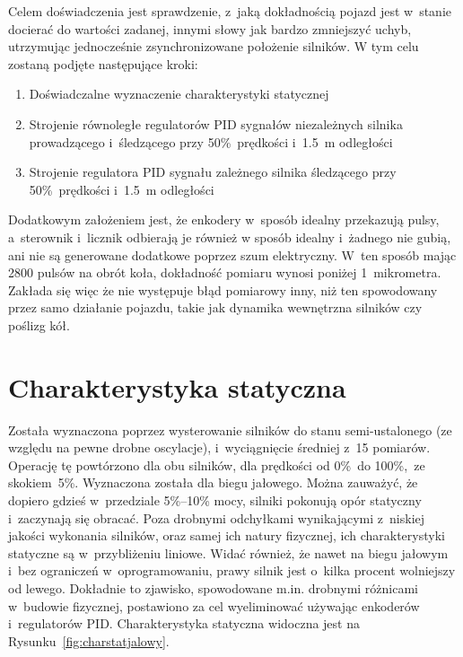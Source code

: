\label{ch:experiment}
Celem doświadczenia jest sprawdzenie, z~jaką dokładnością pojazd jest w~stanie docierać do wartości zadanej, innymi słowy jak bardzo zmniejszyć uchyb, utrzymując jednocześnie zsynchronizowane położenie silników. W tym celu zostaną podjęte następujące kroki:

\begin{enumerate}
    \item Doświadczalne wyznaczenie charakterystyki statycznej
    \item Strojenie równoległe regulatorów PID sygnałów niezależnych silnika prowadzącego i~śledzącego przy 50\%~prędkości i~1.5~m odległości
    \item Strojenie regulatora PID sygnału zależnego silnika śledzącego przy 50\%~prędkości i~1.5~m odległości
\end{enumerate}

Dodatkowym założeniem jest, że enkodery w~sposób idealny przekazują pulsy, a~sterownik i~licznik odbierają je również w sposób idealny i~żadnego nie gubią, ani nie są generowane dodatkowe poprzez szum elektryczny. W~ten sposób mając 2800 pulsów na obrót koła, dokładność pomiaru wynosi poniżej 1~mikrometra. Zakłada się więc że nie występuje błąd pomiarowy inny, niż ten spowodowany przez samo działanie pojazdu, takie jak dynamika wewnętrzna silników czy poślizg kół.

\section{Charakterystyka statyczna}
Została wyznaczona poprzez wysterowanie silników do stanu semi-ustalonego (ze względu na pewne drobne oscylacje), i~wyciągnięcie średniej z~15 pomiarów. Operację tę powtórzono dla obu silników, dla prędkości od 0\%~do 100\%,~ze skokiem~5\%. Wyznaczona została dla biegu jałowego. Można zauważyć, że dopiero gdzieś w~przedziale 5\%--10\% mocy, silniki pokonują opór statyczny i~zaczynają się obracać. Poza drobnymi odchyłkami wynikającymi z~niskiej jakości wykonania silników, oraz samej ich natury fizycznej, ich charakterystyki statyczne są w~przybliżeniu liniowe. Widać również, że nawet na biegu jałowym i~bez ograniczeń w~oprogramowaniu, prawy silnik jest o~kilka procent wolniejszy od lewego. Dokładnie to zjawisko, spowodowane m.in. drobnymi różnicami w~budowie fizycznej, postawiono za cel wyeliminować używając enkoderów i~regulatorów PID. Charakterystyka statyczna widoczna jest na Rysunku~\ref{fig:charstatjalowy}.


